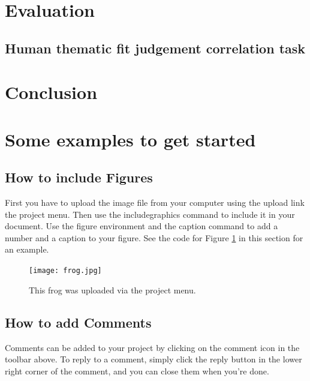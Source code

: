 \documentclass[a4paper]{article}
\begin{document}
\section{Evaluation}

\subsection{Human thematic fit judgement correlation task}







\section{Conclusion}





\newpage



\section{Some examples to get started}

\subsection{How to include Figures}

First you have to upload the image file from your computer using the upload link the project menu. Then use the includegraphics command to include it in your document. Use the figure environment and the caption command to add a number and a caption to your figure. See the code for Figure \ref{fig:frog} in this section for an example.

\begin{figure}
\centering
\texttt{[image: frog.jpg]}
\caption{\label{fig:frog}This frog was uploaded via the project menu.}
\end{figure}

\subsection{How to add Comments}

Comments can be added to your project by clicking on the comment icon in the toolbar above. %
%
%
To reply to a comment, simply click the reply button in the lower right corner of the comment, and you can close them when you're done.
\end{document}
